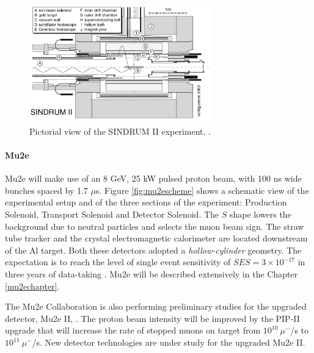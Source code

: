 \begin{figure}[!h]
\centering
\includegraphics[width =0.7\textwidth]{figures/png/Screenshot_20240307_163120.png}
\caption[SINDRUM II experiment.]{Pictorial view of the SINDRUM II experiment, \cite{SINDRUMII:2006dvw}.}
\label{fig:sindrumii}
\end{figure}
\paragraph{Mu2e}
Mu2e will make use of an 8 GeV, 
25 kW pulsed proton beam, with 100 
ns wide bunches spaced by 1.7 $\mu$s. 
Figure \ref{fig:mu2escheme} shows a 
schematic view of the experimental setup and of the
three sections of the experiment: 
Production Solenoid, Transport
Solenoid and Detector Solenoid. The 
$S$ shape lowers the background due to 
neutral particles and selects the 
muon beam sign. 
The straw tube tracker and the crystal 
electromagnetic calorimeter are located 
downstream of the Al target. 
Both these detectors adopted a 
\textit{hollow-cylinder} geometry. 
The expectation is to reach the level of single event sensitivity of 
$SES=3 \times 10^{-17}$ in three years of data-taking \cite{universe9010054}.
Mu2e will be described 
extensively in the Chapter \ref{mu2echapter}.

The Mu2e Collaboration is also 
performing preliminary studies for 
the upgraded detector, Mu2e II, \cite{dukes}. 
The proton beam intensity will be 
improved by the PIP-II upgrade that 
will increase the rate of stopped muons 
on target from $10^{10} \ \mu^-$/s 
to $10^{11} \ \mu^-$/s. New detector 
technologies are under study for the upgraded
Mu2e II.
